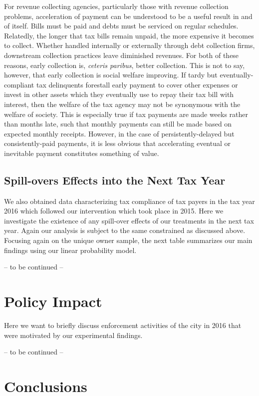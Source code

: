 \documentclass[12pt]{article}
\begin{document}
For revenue collecting agencies, particularly those with revenue
collection problems, acceleration of payment can be understood to be a
useful result in and of itself. Bills must be paid and debts must be
serviced on regular schedules. Relatedly, the longer that tax bills
remain unpaid, the more expensive it becomes to collect. Whether
handled internally or externally through debt collection firms,
downstream collection practices leave diminished revenues. For both of
these reasons, early collection is, \textit{ceteris paribus}, better
collection. This is not to say, however, that early collection is
social welfare improving. If tardy but eventually-compliant tax
delinquents forestall early payment to cover other expenses or invest
in other assets which they eventually use to repay their tax bill with
interest, then the welfare of the tax agency may not be synonymous
with the welfare of society. This is especially true if tax payments
are made weeks rather than months late, such that monthly payments can
still be made based on expected monthly receipts. However, in the case
of persistently-delayed but consistently-paid payments, it is less
obvious that accelerating eventual or inevitable payment constitutes
something of value.

\subsection{Spill-overs Effects into the Next Tax Year}

We also obtained data characterizing tax compliance of tax payers in
the tax year 2016 which followed our intervention which took place in
2015.  Here we investigate the existence of any spill-over effects of
our treatments in the next tax year. Again our analysis is subject to
the same constrained as discussed above.  Focusing again on the unique
owner sample, the next table summarizes our main findings using our
linear probability model.

-- to be continued --

\section{Policy Impact}

Here we want to briefly discuss enforcement activities of the city in
2016 that were motivated by our experimental findings.

-- to be continued --

\section{Conclusions}
\end{document}
